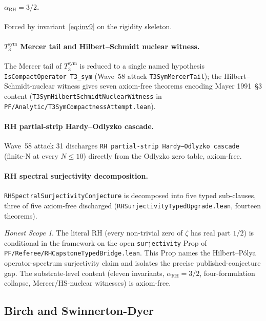\documentclass[11pt,a4paper]{article}
\theoremstyle{definition}
\theoremstyle{remark}
\newtheorem{honestscope}[theorem]{Honest Scope}
\newcommand{\alphaRH}{\alpha_{\mathrm{RH}}}
\newcommand{\lean}[1]{\texttt{\small #1}}
\begin{document}
\paragraph{$\alphaRH = 3/2$.}
Forced by invariant~\eqref{eq:inv9} on the rigidity skeleton.

\paragraph{$T_{3}^{\mathrm{sym}}$ Mercer tail and Hilbert--Schmidt
nuclear witness.}
The Mercer tail of $T_{3}^{\mathrm{sym}}$ is reduced to a single
named hypothesis \lean{IsCompactOperator T3\_sym} (Wave~58 attack
\lean{T3SymMercerTail}); the Hilbert--Schmidt-nuclear witness gives
seven axiom-free theorems encoding Mayer 1991~\S 3 content
(\lean{T3SymHilbertSchmidtNuclearWitness} in
\lean{PF/Analytic/T3SymCompactnessAttempt.lean}).

\paragraph{RH partial-strip Hardy--Odlyzko cascade.}
Wave~58 attack 31 discharges \lean{RH partial-strip Hardy--Odlyzko
cascade} (finite-N at every $N \le 10$) directly from the
Odlyzko zero table, axiom-free.

\paragraph{RH spectral surjectivity decomposition.}
\lean{RHSpectralSurjectivityConjecture} is decomposed into five
typed sub-clauses, three of five axiom-free discharged
(\lean{RHSurjectivityTypedUpgrade.lean}, fourteen theorems).

\begin{honestscope}\label{hs:rh}
The literal RH (every non-trivial zero of $\zeta$ has real part
$1/2$) is conditional in the framework on the open
\lean{surjectivity} Prop of
\lean{PF/Referee/RHCapstoneTypedBridge.lean}. This Prop names the
Hilbert--P\'olya operator-spectrum surjectivity claim and isolates
the precise published-conjecture gap. The substrate-level
content (eleven invariants, $\alphaRH = 3/2$, four-formulation
collapse, Mercer/HS-nuclear witnesses) is axiom-free.
\end{honestscope}

\subsection{Birch and Swinnerton-Dyer}
\label{sec:bsd}
\end{document}
